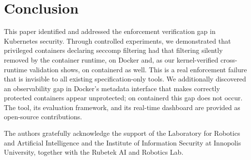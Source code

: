 \documentclass[sigconf]{acmart}
\begin{document}
\section{Conclusion}

This paper identified and addressed the enforcement verification gap in Kubernetes security. Through controlled experiments, we demonstrated that privileged containers declaring seccomp filtering had that filtering silently removed by the container runtime, on Docker and, as our kernel-verified cross-runtime validation shows, on containerd as well. This is a real enforcement failure that is invisible to all existing specification-only tools. We additionally discovered an observability gap in Docker's metadata interface that makes correctly protected containers appear unprotected; on containerd this gap does not occur. The tool, its evaluation framework, and its real-time dashboard are provided as open-source contributions.

\begin{acks}
The authors gratefully acknowledge the support of the Laboratory for Robotics and Artificial Intelligence and the Institute of Information Security at Innopolis University, together with the Rubetek AI and Robotics Lab.
\end{acks}



\end{document}
